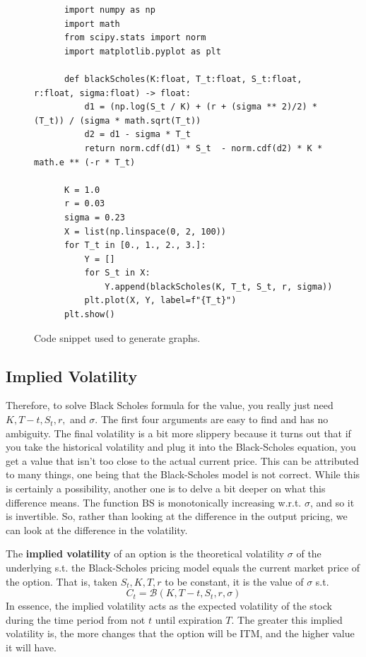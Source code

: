 \documentclass{article}
\begin{document}
  \begin{figure}[H]
    \centering 
    \begin{lstlisting}
      import numpy as np 
      import math
      from scipy.stats import norm
      import matplotlib.pyplot as plt 

      def blackScholes(K:float, T_t:float, S_t:float, r:float, sigma:float) -> float: 
          d1 = (np.log(S_t / K) + (r + (sigma ** 2)/2) * (T_t)) / (sigma * math.sqrt(T_t))  
          d2 = d1 - sigma * T_t 
          return norm.cdf(d1) * S_t  - norm.cdf(d2) * K * math.e ** (-r * T_t)

      K = 1.0 
      r = 0.03
      sigma = 0.23
      X = list(np.linspace(0, 2, 100))
      for T_t in [0., 1., 2., 3.]: 
          Y = []
          for S_t in X: 
              Y.append(blackScholes(K, T_t, S_t, r, sigma))
          plt.plot(X, Y, label=f"{T_t}")
      plt.show() 
    \end{lstlisting}
    \caption{Code snippet used to generate graphs.} 
    \label{fig:black_scholes_graph_code}
  \end{figure}

  \subsection{Implied Volatility} 

    Therefore, to solve Black Scholes formula for the value, you really just need $K, T - t, S_t, r,$ and $\sigma$. The first four arguments are easy to find and has no ambiguity. The final volatility is a bit more slippery because it turns out that if you take the historical volatility and plug it into the Black-Scholes equation, you get a value that isn't too close to the actual current price. This can be attributed to many things, one being that the Black-Scholes model is not correct. While this is certainly a possibility, another one is to delve a bit deeper on what this difference means. The function $\mathrm{BS}$ is monotonically increasing w.r.t. $\sigma$, and so it is invertible. So, rather than looking at the difference in the output pricing, we can look at the difference in the volatility. 

    \begin{definition}
      The \textbf{implied volatility} of an option is the theoretical volatility $\sigma$ of the underlying s.t. the Black-Scholes pricing model equals the current market price of the option. That is, taken $S_t, K, T, r$ to be constant, it is the value of $\sigma$ s.t. 
      \begin{equation}
        C_t = \mathcal{B}(K, T - t, S_t, r, \sigma)
      \end{equation}
      In essence, the implied volatility acts as the expected volatility of the stock during the time period from not $t$ until expiration $T$. The greater this implied volatility is, the more changes that the option will be ITM, and the higher value it will have. 
    \end{definition}
\end{document}
